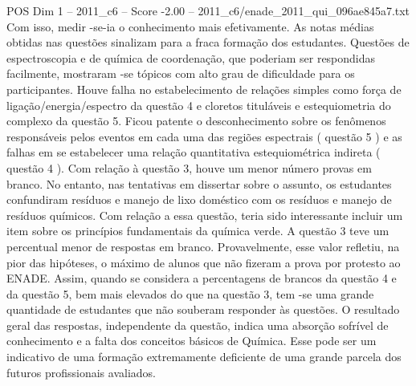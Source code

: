 \begin{textsample}{POS Dim 1 – 2011\_c6 – Score -2.00 – 2011\_c6/enade\_2011\_qui\_096ae845a7.txt}
Com isso, medir -se-ia o conhecimento mais efetivamente.
As notas médias obtidas nas questões sinalizam para a fraca formação dos estudantes.
Questões de espectroscopia e de química de coordenação, que poderiam ser respondidas facilmente, mostraram -se tópicos com alto grau de dificuldade para os participantes.
Houve falha no estabelecimento de relações simples como força de ligação/energia/espectro da questão 4 e cloretos tituláveis e estequiometria do complexo da questão 5.
Ficou patente o desconhecimento sobre os fenômenos responsáveis pelos eventos em cada uma das regiões espectrais ( questão 5 ) e as falhas em se estabelecer uma relação quantitativa estequiométrica indireta ( questão 4 ).
Com relação à questão 3, houve um menor número provas em branco.
No entanto, nas tentativas em dissertar sobre o assunto, os estudantes confundiram resíduos e manejo de lixo doméstico com os resíduos e manejo de resíduos químicos.
Com relação a essa questão, teria sido interessante incluir um item sobre os princípios fundamentais da química verde.
A questão 3 teve um percentual menor de respostas em branco.
Provavelmente, esse valor refletiu, na pior das hipóteses, o máximo de alunos que não fizeram a prova por protesto ao ENADE.
Assim, quando se considera a percentagens de brancos da questão 4 e da questão 5, bem mais elevados do que na questão 3, tem -se uma grande quantidade de estudantes que não souberam responder às questões.
O resultado geral das respostas, independente da questão, indica uma absorção sofrível de conhecimento e a falta dos conceitos básicos de Química.
Esse pode ser um indicativo de uma formação extremamente deficiente de uma grande parcela dos futuros profissionais avaliados.

\end{textsample}
